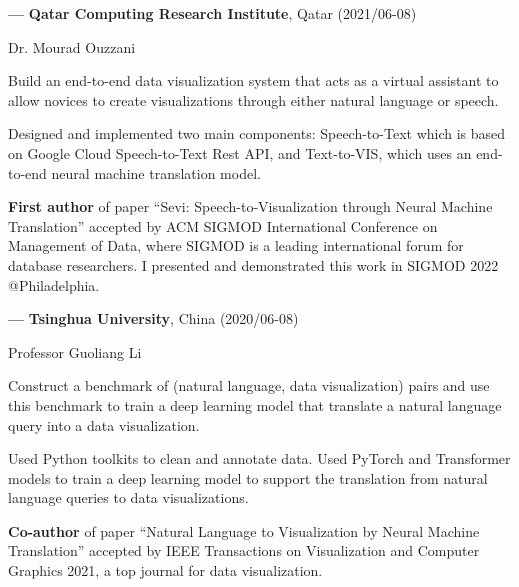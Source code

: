 \documentclass[10pt,a4paper,sans]{./moderncv/moderncv}
\begin{document}
\vspace{2ex}
\cvline
{\textbf{\Large ---}}
{\large\textbf{Qatar Computing Research Institute}, Qatar (2021/06-08)}

{Dr. Mourad Ouzzani}

{Build an end-to-end data visualization system that acts as a virtual assistant to allow novices to create visualizations through either natural language or speech.}

{Designed and implemented two main components: Speech-to-Text which is based on Google Cloud Speech-to-Text Rest API, and Text-to-VIS, which uses an end-to-end neural machine translation model.}

{\textbf{First author} of paper ``Sevi: Speech-to-Visualization through Neural Machine Translation'' accepted by ACM SIGMOD International Conference on Management of Data, where SIGMOD is a leading international forum for database researchers. I presented and demonstrated this work in SIGMOD 2022 @Philadelphia.}

\vspace{2ex}
\cvline
{\textbf{\Large ---}}
{\large\textbf{Tsinghua University}, China (2020/06-08)}


{Professor Guoliang Li}

{Construct a benchmark of (natural language, data visualization) pairs and use this benchmark to train a deep learning model that translate a natural language query into a data visualization.}

{Used Python toolkits to clean and annotate data. Used PyTorch and Transformer models to train a deep learning model to support the translation from natural language queries to data visualizations.}

{\textbf{Co-author} of paper ``Natural Language to Visualization by Neural Machine Translation'' accepted by IEEE Transactions on Visualization and Computer Graphics 2021, a top journal for data visualization.}
\end{document}
